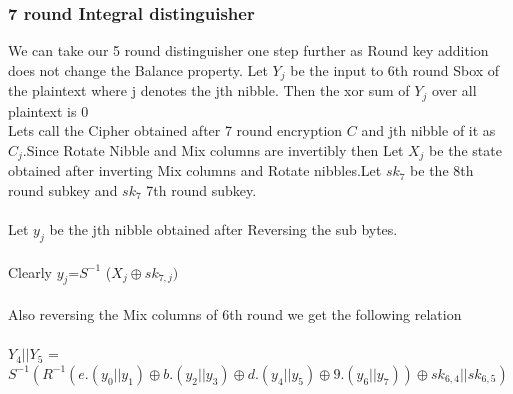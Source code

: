 \documentclass[preprint]{transcrypto}
\begin{document}
\subsubsection{7 round Integral distinguisher}

We can take our 5 round distinguisher one step further as Round key addition does not change the Balance property. Let $Y_{j}$ be the input to 6th round Sbox of the  plaintext where j denotes the jth nibble. Then the xor sum of $Y_{j}$ over all plaintext is 0 \\

Lets call the Cipher obtained after 7 round encryption $C$ and jth nibble of it as  $C_{j}$.Since Rotate Nibble and Mix columns are invertibly then Let $X_{j}$ be the state obtained after inverting Mix columns and Rotate nibbles.Let $sk_{7}$ be the 8th round subkey and $sk_{7}$ 7th round subkey. \\
\\
Let $y_{j}$ be the jth nibble obtained after Reversing the sub bytes.\\ \\ Clearly $y_{j}$=$S^{-1}$ ($X_{j}\oplus sk_{7,j}) $ 
\\ \\
Also reversing the Mix columns of 6th round we get the following relation \\ \\
	$Y_{4}||Y_{5}$ = $S^{-1}(R^{-1}(e.(y_{0}||y_{1})\oplus b.(y_{2}||y_{3})\oplus d.(y_{4}||y_{5})\oplus9.(y_{6}|| y_{7}))
	\oplus sk_{6,4} || sk_{6,5})$
\\ \\
\end{document}
